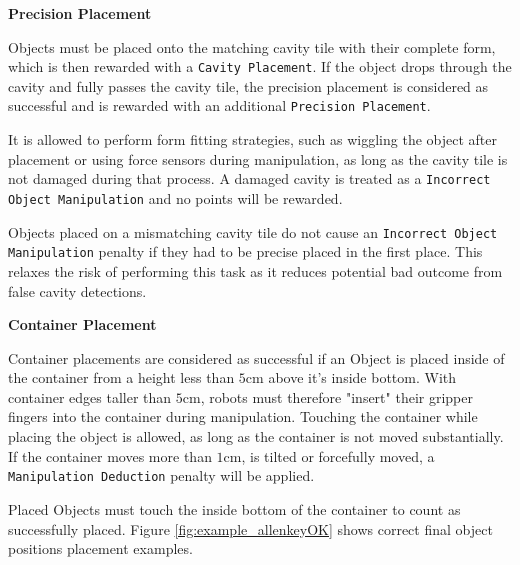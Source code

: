 \clearpage

\textbf{Precision Placement}

Objects must be placed onto the matching cavity tile with their complete form, which is then rewarded with a \texttt{Cavity Placement}.
If the object drops through the cavity and fully passes the cavity tile, the precision placement is considered as successful and is rewarded with an additional \texttt{Precision Placement}. 

It is allowed to perform form fitting strategies, such as wiggling the object after placement or using force sensors during manipulation,
as long as the cavity tile is not damaged during that process. A damaged cavity is treated as a \texttt{Incorrect Object Manipulation} and no points will be rewarded.

Objects placed on a mismatching cavity tile do not cause an \texttt{Incorrect Object Manipulation} penalty if they had to be precise placed in the first place. This relaxes the risk of performing this task as it reduces potential bad outcome from false cavity detections.
 

\textbf{Container Placement}

Container placements are considered as successful if an Object is placed inside of the container from a height less than $5\si{\centi\meter}$ above it's inside bottom. With container edges taller than $5\si{\centi\meter}$, robots must therefore "insert" their gripper fingers into the container during manipulation. Touching the container while placing the object is allowed, as long as the container is not moved substantially.
If the container moves more than $1\si{\centi\meter}$, is tilted or forcefully moved, a \texttt{Manipulation Deduction} penalty will be applied.

Placed Objects must touch the inside bottom of the container to count as successfully placed.
Figure \ref{fig:example_allenkeyOK} shows correct final object positions placement examples. 

